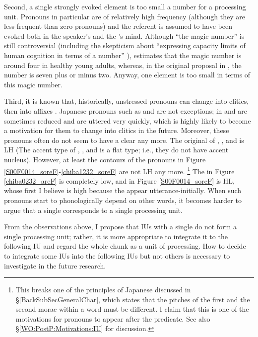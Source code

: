 Second, a single strongly evoked element is too small a number for a processing unit.
Pronouns in particular are of relatively high frequency (although they are less frequent than zero pronouns) and the referent is assumed to have been evoked both in the speaker's and the 's mind.
Although ``the magic number'' is still controversial (including the skepticism about ``expressing capacity limits of human cognition in terms of a number'' \cite[][p.~245]{oberauer07}),
 estimates that the magic number is around four in healthy young adults,
whereas, in the original proposal in ,
the number is seven plus or minus two.
Anyway, one element is too small in terms of this magic number.



Third,
it is known that, historically, unstressed pronouns can change into clitics, then into affixes \cite{givon76}.
Japanese pronouns such as  and  are not exceptions;
 in  and  are sometimes reduced and are uttered very quickly,
which is highly likely to become a motivation for them to change into clitics in the future.
Moreover, these pronouns often do not seem to have a clear  any more.
The original  of , , and  is LH
(The accent type of , , and  is a flat type;
i.e., they do not have accent nucleus).
However, at least the  contours of the pronouns in Figure \ref{S00F0014_soreF}-\ref{chiba1232_soreF} are not LH any more.%
	\footnote{
	This breaks one of the  principles of Japanese discussed in \S \ref{BackSubSecGeneralChar},
	which states that the pitches of the first and the second morae within a word must be different.
	I claim that this is one of the motivations for pronouns to appear after the predicate.
	See also \S \ref{WO:PostP:Motivations:IU} for discussion.
	}
The   in Figure \ref{chiba0232_areF} is completely low,
and  in Figure \ref{S00F0014_soreF} is HL, whose first  I believe is high because the  appear utterance-initially.
When such  pronouns start to phonologically depend on other words,
it becomes harder to argue that a single  corresponds to a single processing unit.

From the observations above,
I propose that IUs with a single  do not form a single processing unit;
rather, it is more appropriate to integrate it to the following IU and regard the whole chunk as a unit of processing.
How to decide to integrate some IUs into the following IUs but not others is necessary to investigate in the future research.

